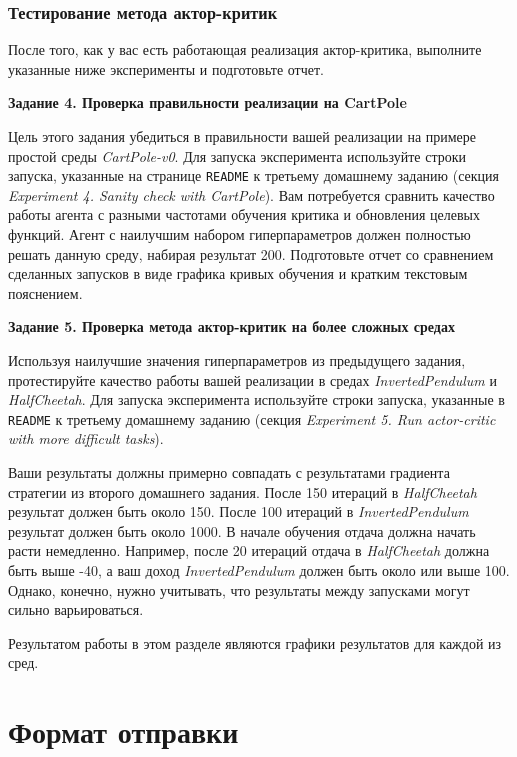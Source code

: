 \documentclass[12pt, oneside]{article}
\begin{document}
\subsubsection{Тестирование метода актор-критик}

После того, как у вас есть работающая реализация актор-критика, выполните указанные ниже эксперименты и подготовьте отчет.

\textbf{Задание 4. Проверка правильности реализации на CartPole}

Цель этого задания убедиться в правильности вашей реализации на примере простой среды \textit{CartPole-v0}. Для запуска эксперимента используйте строки запуска, указанные на странице \verb|README| к третьему домашнему заданию (секция \textit{Experiment 4. Sanity check with CartPole}). Вам потребуется сравнить качество работы агента с разными частотами обучения критика и обновления целевых функций. Агент с наилучшим набором гиперпараметров должен полностью решать данную среду, набирая результат 200. Подготовьте отчет со сравнением сделанных запусков в виде графика кривых обучения и кратким текстовым пояснением.

\textbf{Задание 5. Проверка метода актор-критик на более сложных средах}

Используя наилучшие значения гиперпараметров из предыдущего задания, протестируйте качество работы вашей реализации в средах \textit{InvertedPendulum} и \textit{HalfCheetah}. Для запуска эксперимента используйте строки запуска, указанные в \verb|README| к третьему домашнему заданию (секция \textit{Experiment 5. Run actor-critic with more difficult tasks}).

Ваши результаты должны примерно совпадать с результатами градиента стратегии из второго домашнего задания. После 150 итераций в \textit{HalfCheetah} результат должен быть около 150. После 100 итераций в \textit{InvertedPendulum} результат должен быть около 1000. В начале обучения отдача должна начать расти немедленно. Например, после 20 итераций отдача в \textit{HalfCheetah} должна быть выше -40, а ваш доход \textit{InvertedPendulum} должен быть около или выше 100. Однако, конечно, нужно учитывать, что результаты между запусками могут сильно варьироваться.

Результатом работы в этом разделе являются графики результатов для каждой из сред.


\section{Формат отправки}
\end{document}
